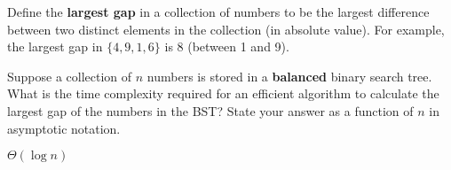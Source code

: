 \begin{prob}
    Define the \textbf{largest gap} in a collection of numbers to be the largest difference
    between two distinct elements in the collection (in absolute value).
    For example, the largest gap in $\{4, 9, 1, 6\}$ is 8 (between 1 and 9).

    Suppose a collection of $n$ numbers is stored in a \textbf{balanced} binary search
    tree.
    What is the time complexity required for an efficient algorithm to calculate
    the largest gap of the numbers in the BST? State your answer as a function of $n$ in
    asymptotic notation.

    \begin{soln}
        $\Theta(\log n)$
    \end{soln}

\end{prob}

